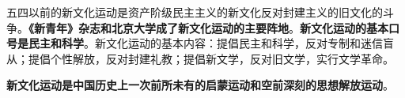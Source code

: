 五四以前的新文化运动是资产阶级民主主义的新文化反对封建主义的旧文化的斗争。\textbf{《新青年》杂志和北京大学成了新文化运动的主要阵地}。\textbf{新文化运动的{基本口号}是民主和科学}。新文化运动的{基本内容}：提倡民主和科学，反对专制和迷信盲从；提倡个性解放，反对封建礼教；提倡新文学，反对旧文学，实行文学革命。

\textbf{新文化运动是中国历史上一次前所未有的启蒙运动和空前深刻的思想解放运动}{。}

